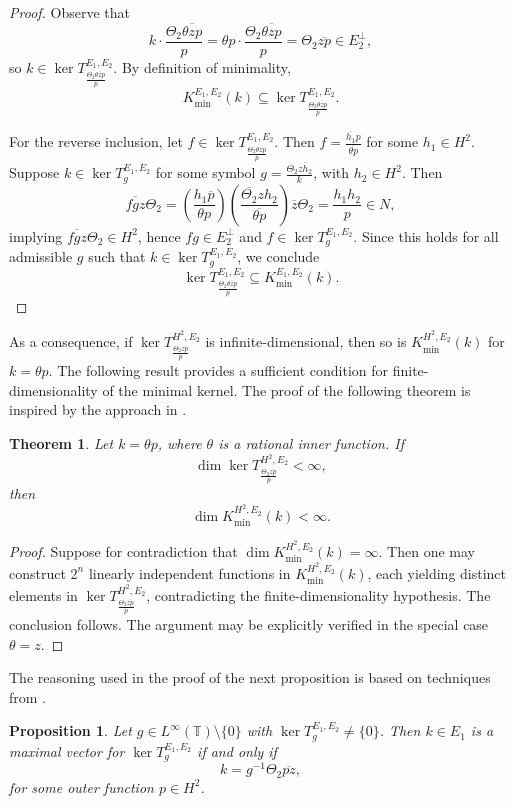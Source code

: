 \documentclass[12pt,a4paper]{amsart}
\newtheorem{theorem}{Theorem}[section]
\newtheorem{Proposition}[Definition]{Proposition}
\begin{document}
\begin{proof}
Observe that
\[
k \cdot \frac{\Theta_2 \overline{\theta zp}}{p} = \theta p \cdot \frac{\Theta_2 \overline{\theta zp}}{p} = \Theta_2 \overline{zp} \in E_2^\perp,
\]
so \( k \in \ker T_{\frac{\Theta_2 \overline{\theta zp}}{p}}^{E_1, E_2} \). By definition of minimality,
\[
K_{\min}^{E_1, E_2}(k) \subseteq \ker T_{\frac{\Theta_2 \overline{\theta zp}}{p}}^{E_1, E_2}.
\]

For the reverse inclusion, let \( f \in \ker T_{\frac{\Theta_2 \overline{\theta zp}}{p}}^{E_1, E_2} \). Then \( f = \frac{\overline{h_1}p}{\overline{\theta p}} \) for some \( h_1 \in H^2 \). Suppose \( k \in \ker T_g^{E_1, E_2} \) for some symbol \( g = \frac{\Theta_2 \overline{z h_2}}{k} \), with \( h_2 \in H^2 \). Then
\[
\overline{fgz} \Theta_2 = \left( \frac{h_1 \overline{p}}{\theta p} \right) \left( \frac{\overline{\Theta_2} z h_2}{\overline{\theta p}} \right) \overline{z} \Theta_2 = \frac{h_1 h_2}{p} \in N,
\]
implying \( \overline{fgz} \Theta_2 \in H^2 \), hence \( fg \in E_2^\perp \) and \( f \in \ker T_g^{E_1, E_2} \). Since this holds for all admissible \( g \) such that \( k \in \ker T_g^{E_1, E_2} \), we conclude
\[
\ker T_{\frac{\Theta_2 \overline{\theta zp}}{p}}^{E_1, E_2} \subseteq K_{\min}^{E_1, E_2}(k).
\]
\end{proof}

As a consequence, if \( \ker T_{\frac{\Theta_2 \overline{zp}}{p}}^{H^2, E_2} \) is infinite-dimensional, then so is \( K_{\min}^{H^2, E_2}(k) \) for \( k = \theta p \). The following result provides a sufficient condition for finite-dimensionality of the minimal kernel. The proof of the following theorem is inspired by the approach in \cite{Cam2014part}.

\begin{theorem}
Let \( k = \theta p \), where \( \theta \) is a rational inner function. If
\[
\dim \ker T_{\frac{\Theta_2 \overline{zp}}{p}}^{H^2, E_2} < \infty,
\]
then
\[
\dim K_{\min}^{H^2, E_2}(k) < \infty.
\]
\end{theorem}

\begin{proof}
Suppose for contradiction that \( \dim K_{\min}^{H^2, E_2}(k) = \infty \). Then one may construct \( 2^n \) linearly independent functions in \( K_{\min}^{H^2, E_2}(k) \), each yielding distinct elements in \( \ker T_{\frac{\Theta_2 \overline{zp}}{p}}^{H^2, E_2} \), contradicting the finite-dimensionality hypothesis. The conclusion follows. The argument may be explicitly verified in the special case \( \theta = z \).
\end{proof}
The reasoning used in the proof of the next proposition is based on techniques from \cite{camara2018multipliers}.
\begin{Proposition}\label{thm5}
Let \( g \in L^\infty(\mathbb T) \setminus \{0\} \) with \( \ker T_g^{E_1, E_2} \neq \{0\} \). Then \( k \in E_1 \) is a maximal vector for \( \ker T_g^{E_1, E_2} \) if and only if
\[
k = g^{-1} \Theta_2 \overline{pz},
\]
for some outer function \( p \in H^2 \).
\end{Proposition}
\end{document}

